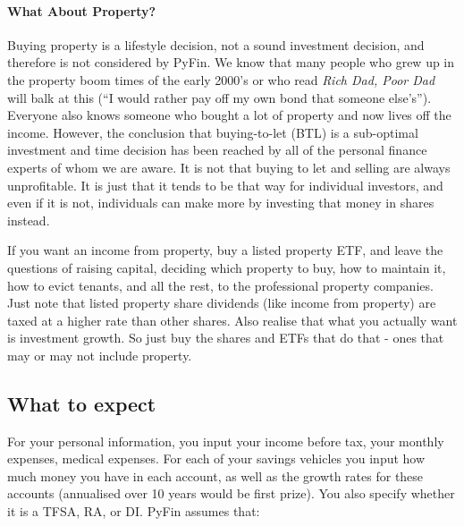 \documentclass[a4paper, justified]{tufte-handout}
\begin{document}
\paragraph{What About Property?}
Buying property is a lifestyle decision, not a sound investment decision, and therefore is not considered by PyFin. We know that many people who grew up in the property boom times of the early 2000's or who read \textit{Rich Dad, Poor Dad} will balk at this (``I would rather pay off my own bond that someone else's''). Everyone also knows someone who bought a lot of property and now lives off the income. However, the conclusion that buying-to-let (BTL) is a sub-optimal investment and time decision has been reached by all of the personal finance experts of whom we are aware. It is not that buying to let and selling are always unprofitable. It is just that it tends to be that way for individual investors, and even if it is not, individuals can make more by investing that money in shares instead. 

If you want an income from property, buy a listed property ETF, and leave the questions of raising capital, deciding which property to buy, how to maintain it, how to evict tenants, and all the rest, to the professional property companies. Just note that listed property share dividends (like income from property) are taxed at a higher rate than other shares. Also realise that what you actually want is investment growth. So just buy the shares and ETFs that do that - ones that may or may not include property.

\subsection{What to expect}

For your personal information, you input your income before tax, your monthly expenses, medical expenses. For each of your savings vehicles you input how much money you have in each account, as well as the growth rates for these accounts (annualised over 10 years would be first prize). You also specify whether it is a TFSA, RA, or DI. PyFin assumes that:
\end{document}
